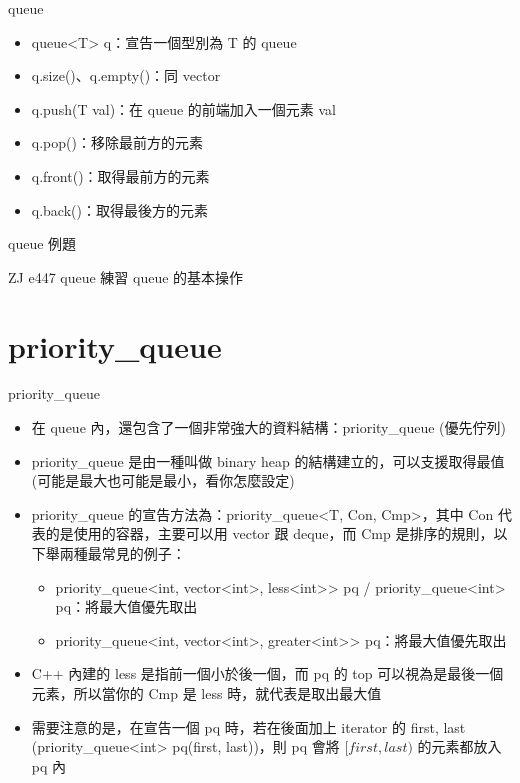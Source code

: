 \documentclass[aspectratio=169]{beamer}
\begin{document}
    \begin{frame}{queue}
        \begin{itemize}
            \item<1-> queue<T> q：宣告一個型別為 T 的 queue
            \item<1-> q.size()、q.empty()：同 vector
            \item<2-> q.push(T val)：在 queue 的前端加入一個元素 val
            \item<2-> q.pop()：移除最前方的元素
            \item<3-> q.front()：取得最前方的元素
            \item<3-> q.back()：取得最後方的元素
        \end{itemize}
    \end{frame}

    \begin{frame}{queue 例題}
        \begin{block}{ZJ e447 queue 練習}
            queue 的基本操作
        \end{block}
    \end{frame}

    \section{priority\_queue}

    \begin{frame}{priority\_queue}
        \begin{itemize}
            \item<1-> 在 queue 內，還包含了一個非常強大的資料結構：priority\_queue (優先佇列)
            \item<2-> priority\_queue 是由一種叫做 binary heap 的結構建立的，可以支援取得最值 (可能是最大也可能是最小，看你怎麼設定)
            \item<3-> priority\_queue 的宣告方法為：priority\_queue<T, Con, Cmp>，其中 Con 代表的是使用的容器，主要可以用 vector 跟 deque，而 Cmp 是排序的規則，以下舉兩種最常見的例子：
            \begin{itemize}
                \item<4-> priority\_queue<int, vector<int>, less<int>> pq / priority\_queue<int> pq：將最大值優先取出
                \item<4-> priority\_queue<int, vector<int>, greater<int>> pq：將最大值優先取出
            \end{itemize}
            \item<5-> C++ 內建的 less 是指前一個小於後一個，而 pq 的 top 可以視為是最後一個元素，所以當你的 Cmp 是 less 時，就代表是取出最大值
            \item<6-> 需要注意的是，在宣告一個 pq 時，若在後面加上 iterator 的 first, last (priority\_queue<int> pq(first, last))，則 pq 會將 $[first, last)$ 的元素都放入 pq 內
        \end{itemize}
    \end{frame}
\end{document}
